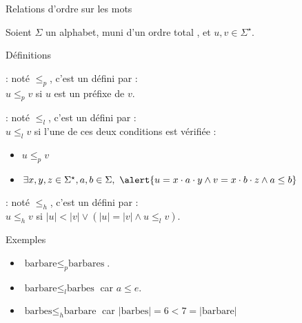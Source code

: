 
\begingroup

\begin{frame}{Relations d'ordre sur les mots}

  Soient $\Sigma$ un alphabet, muni d'un ordre total \structure{$\le$}, et $u, v \in \Sigma^\star$.

  \begin{block}{Définitions}
    \begin{description}
    \item[Ordre préfixiel]: noté \alert{$\le_p$}, c'est un  défini par : \\
      \alert{$u \le_p v$} si \alert{$u$ est un préfixe de $v$}.
 
    \item[Ordre lexicographique]: noté \alert{$\le_l$}, c'est un  défini par :\\
       \alert{$u \le_l v$} si l'une de ces deux conditions est vérifiée :
        \begin{itemize}
        \item \alert{$u \le_p v$}
        \item $\exists x, y, z \in \Sigma^\star, a, b \in \Sigma,~ \alert{u = x\cdot a\cdot y \land v = x\cdot b\cdot z \land a \le b}$
        \end{itemize}

    \item[Ordre hiérarchique]: noté \alert{$\le_h$}, c'est un  défini par :\\
      \alert{$u \le_h v$} si \alert{$|u| < |v| \lor (|u| = |v| \land u \le_l v)$}.
    \end{description}
  \end{block}

  \begin{exampleblock}{Exemples}
    \begin{itemize}
      \item $\text{barbare} \le_p \text{barbares}$. 
      \item $\text{barbare} \le_l \text{barbes}$ car $a \le e$. 
      \item $\text{barbes} \le_h \text{barbare}$ car $|\text{barbes}| = 6 < 7 = |\text{barbare}|$
    \end{itemize}
  \end{exampleblock}
  
\end{frame}

\endgroup
\endinput
